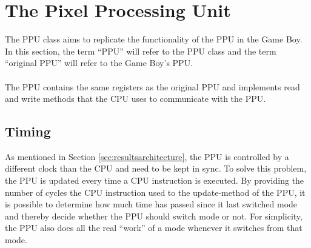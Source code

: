 \newpage
\section{The Pixel Processing Unit}
The PPU class aims to replicate the functionality of the PPU in the Game Boy. In this section, the term ``PPU'' will refer to the PPU class and the term ``original PPU'' will refer to the Game Boy's PPU.\\
\\
The PPU contains the same registers as the original PPU and implements read and write methods that the CPU uses to communicate with the PPU.

\subsection{Timing}
As mentioned in Section \ref{sec:resultsarchitecture}, the PPU is controlled by a different clock than the CPU and need to be kept in sync. To solve this problem, the PPU is updated every time a CPU instruction is executed. By providing the number of cycles the CPU instruction used to the update-method of the PPU, it is possible to determine how much time has passed since it last switched mode and thereby decide whether the PPU should switch mode or not. For simplicity, the PPU also does all the real ``work'' of a mode whenever it switches from that mode.

